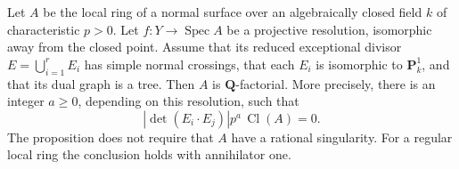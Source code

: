 \begin{proposition}
\label{D:rational-tree-Qfactorial}
Let $A$ be the local ring of a normal surface over an algebraically closed
field $k$ of characteristic $p>0$.  Let $f:Y\to\operatorname{Spec}A$
be a projective resolution, isomorphic away from the closed point.
Assume that its reduced exceptional divisor $E=\bigcup_{i=1}^rE_i$
has simple normal crossings, that each $E_i$ is isomorphic to
$\mathbf P^1_k$, and that its dual graph is a tree.
Then $A$ is $\mathbf Q$-factorial.  More precisely, there is an integer
$a\geq0$, depending on this resolution, such that
\[
  |\det(E_i\cdot E_j)|p^a\,\operatorname{Cl}(A)=0.
\]
The proposition does not require that $A$ have a rational singularity.
For a regular local ring the conclusion holds with annihilator one.
\end{proposition}

